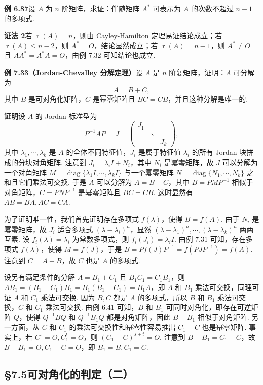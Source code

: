 \documentclass[UTF8,12pt,a4paper,fontset=fandol]{ctexart}
\begin{document}
\noindent\textbf{例 6.87}\quad 设 $A$ 为 $n$ 阶矩阵，求证：伴随矩阵 $A^*$ 可表示为 $A$ 的次数不超过 $n-1$ 的多项式.

\noindent\textbf{证法 2}\quad 若 $\operatorname{r}(A)=n$，则由 Cayley-Hamilton 定理易证结论成立；若 $\operatorname{r}(A)\le n-2$，则 $A^*=O$，结论显然成立；若 $\operatorname{r}(A)=n-1$，则 $A^*\ne O$ 且 $AA^*=A^*A=O$，由例 7.32 可知结论也成立.

\noindent\textbf{例 7.33（Jordan-Chevalley 分解定理）}\quad 设 $A$ 是 $n$ 阶复矩阵，证明：$A$ 可分解为
\[
A=B+C,
\]
其中 $B$ 是可对角化矩阵，$C$ 是幂零矩阵且 $BC=CB$，并且这种分解是唯一的.

\noindent\textbf{证明}\quad 设 $A$ 的 Jordan 标准型为
\[
P^{-1}AP=J=
\left(\begin{array}{ccc}
J_1 &        &  \\
    & \ddots &  \\
    &        & J_k
\end{array}\right),
\]
其中 $\lambda_1,\cdots,\lambda_k$ 是 $A$ 的全体不同特征值，$J_i$ 是属于特征值 $\lambda_i$ 的所有 Jordan 块拼成的分块对角矩阵. 注意到 $J_i=\lambda_iI+N_i$，其中 $N_i$ 是幂零矩阵，故 $J$ 可以分解为一个对角矩阵 $M=\operatorname{diag}\{\lambda_1I,\cdots,\lambda_kI\}$ 与一个幂零矩阵 $N=\operatorname{diag}\{N_1,\cdots,N_k\}$ 之和且它们乘法可交换. 于是 $A$ 可以分解为 $A=B+C$，其中 $B=PMP^{-1}$ 相似于对角矩阵，$C=PNP^{-1}$ 是幂零矩阵且 $BC=CB$. 这时显然有 $AB=BA,AC=CA$.

为了证明唯一性，我们首先证明存在多项式 $f(\lambda)$，使得 $B=f(A)$. 由于 $N_i$ 是幂零矩阵，故 $J_i$ 适合多项式 $(\lambda-\lambda_i)^n$，显然 $(\lambda-\lambda_1)^n,\cdots,(\lambda-\lambda_k)^n$ 两两互素. 设 $f_i(\lambda)=\lambda_i$ 为常数多项式，则 $f_i(J_i)=\lambda_iI$. 由例 7.31 可知，存在多项式 $f(\lambda)$，使得 $M=f(J)$，于是 $B=Pf(J)P^{-1}=f(PJP^{-1})=f(A)$. 注意到 $C=A-B$，故 $C$ 也是 $A$ 的多项式.

设另有满足条件的分解 $A=B_1+C_1$ 且 $B_1C_1=C_1B_1$，则 $AB_1=(B_1+C_1)B_1=B_1(B_1+C_1)=B_1A$，即 $A$ 和 $B_1$ 乘法可交换，同理可证 $A$ 和 $C_1$ 乘法可交换. 因为 $B,C$ 都是 $A$ 的多项式，所以 $B$ 和 $B_1$ 乘法可交换，$C$ 和 $C_1$ 乘法可交换. 由例 6.41 可知，$B$ 和 $B_1$ 可同时对角化，即存在可逆矩阵 $Q$，使得 $Q^{-1}BQ$ 和 $Q^{-1}B_1Q$ 都是对角矩阵，因此 $B-B_1$ 相似于对角矩阵. 另一方面，从 $C$ 和 $C_1$ 的乘法可交换性和幂零性容易推出 $C_1-C$ 也是幂零矩阵. 事实上，若 $C^s=O,C_1^t=O$，则 $(C_1-C)^{s+t}=O$. 注意到 $B-B_1=C_1-C$，故 $B-B_1=O,C_1-C=O$，即 $B_1=B,C_1=C$.

\subsection*{§7.5\quad 可对角化的判定（二）}
\end{document}
